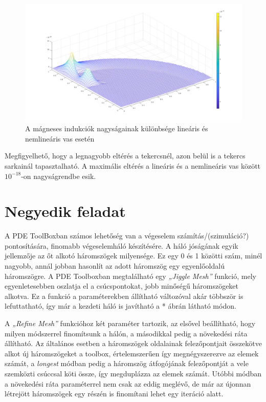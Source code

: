 \begin{figure}[!ht]
	\centering
	\includegraphics[width=150mm, keepaspectratio]{figures/terek/kulonbseg}
	\caption{A mágneses indukciók nagyságainak különbsége lineáris és nemlineáris vas esetén}
	\label{fig:kulonbseg}
\end{figure}

Megfigyelhető, hogy a legnagyobb eltérés a tekercsnél, azon belül is a tekercs sarkainál tapasztalható. A maximális eltérés a lineáris és a nemlineáris vas között $ 10^{-18} $-on nagyságrendbe esik.




\section{Negyedik feladat}

A PDE ToolBoxban számos lehetőség van a végeselem számítás/(szimuláció?) pontosítására, finomabb végeselemháló készítésére. A háló jóságának egyik jellemzője az őt alkotó háromszögek milyensége. Ez egy 0 és 1 közötti szám, minél nagyobb, annál jobban hasonlít az adott háromszög egy egyenlőoldalú háromszögre. A PDE Toolboxban megtalálható egy \textit{„Jiggle Mesh”} funkció, mely egyenletesebben oszlatja el a csúcspontokat, jobb minőségű háromszögeket alkotva. Ez a funkció a paraméterekben állítható változóval akár többször is lefuttatható, így már a kezdeti háló is javítható a * ábrán látható módon.

A \textit{„Refine Mesh”} funkcióhoz két paraméter tartozik, az elsővel beállítható, hogy milyen módszerrel finomítsunk a hálón, a másodikkal pedig a növekedési ráta állítható. Az általános esetben a háromszögek oldalainak felezőpontjait összekötve alkot új háromszögeket a toolbox, értelemszerűen így megnégyszerezve az elemek számát, a \textit{longest} módban pedig a háromszög átfogójának felezőpontját a vele szemközti csúccsal köti össze, így megduplázza az elemek számát. Utóbbi módban a növekedési ráta paraméterrel nem csak az eddig meglévő, de már az újonnan létrejött háromszögek egy részén is finomítani lehet egy iteráció alatt.

